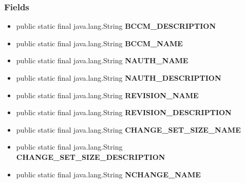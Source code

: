 {{\subsubsection{Fields}{
\begin{itemize}
\item{
\label{it.unisa.sesa.repominer.db.entities.Metric.BCCM_DESCRIPTION}\hypertarget{it.unisa.sesa.repominer.db.entities.Metric.BCCM_DESCRIPTION}{public static final java.lang.String {\bf  BCCM\_DESCRIPTION}}
}
\item{
\label{it.unisa.sesa.repominer.db.entities.Metric.BCCM_NAME}\hypertarget{it.unisa.sesa.repominer.db.entities.Metric.BCCM_NAME}{public static final java.lang.String {\bf  BCCM\_NAME}}
}
\item{
\label{it.unisa.sesa.repominer.db.entities.Metric.NAUTH_NAME}\hypertarget{it.unisa.sesa.repominer.db.entities.Metric.NAUTH_NAME}{public static final java.lang.String {\bf  NAUTH\_NAME}}
}
\item{
\label{it.unisa.sesa.repominer.db.entities.Metric.NAUTH_DESCRIPTION}\hypertarget{it.unisa.sesa.repominer.db.entities.Metric.NAUTH_DESCRIPTION}{public static final java.lang.String {\bf  NAUTH\_DESCRIPTION}}
}
\item{
\label{it.unisa.sesa.repominer.db.entities.Metric.REVISION_NAME}\hypertarget{it.unisa.sesa.repominer.db.entities.Metric.REVISION_NAME}{public static final java.lang.String {\bf  REVISION\_NAME}}
}
\item{
\label{it.unisa.sesa.repominer.db.entities.Metric.REVISION_DESCRIPTION}\hypertarget{it.unisa.sesa.repominer.db.entities.Metric.REVISION_DESCRIPTION}{public static final java.lang.String {\bf  REVISION\_DESCRIPTION}}
}
\item{
\label{it.unisa.sesa.repominer.db.entities.Metric.CHANGE_SET_SIZE_NAME}\hypertarget{it.unisa.sesa.repominer.db.entities.Metric.CHANGE_SET_SIZE_NAME}{public static final java.lang.String {\bf  CHANGE\_SET\_SIZE\_NAME}}
}
\item{
\label{it.unisa.sesa.repominer.db.entities.Metric.CHANGE_SET_SIZE_DESCRIPTION}\hypertarget{it.unisa.sesa.repominer.db.entities.Metric.CHANGE_SET_SIZE_DESCRIPTION}{public static final java.lang.String {\bf  CHANGE\_SET\_SIZE\_DESCRIPTION}}
}
\item{
\label{it.unisa.sesa.repominer.db.entities.Metric.NCHANGE_NAME}\hypertarget{it.unisa.sesa.repominer.db.entities.Metric.NCHANGE_NAME}{public static final java.lang.String {\bf  NCHANGE\_NAME}}
}
\end{itemize}}}}
